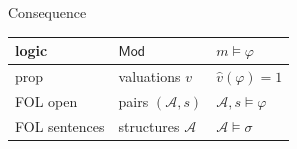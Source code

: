 \begin{modelbox}{Consequence}



\begin{modelbindingblock}
\begin{center}
\begin{tabularx}{\linewidth}{@{}lXX@{}}
\toprule
logic & \(\mathsf{Mod}\) & \(m\models\varphi\) \\
\midrule
prop & valuations \(v\) & \(\widehat v(\varphi)=1\) \\
FOL open & pairs \((\mathcal A,s)\) & \(\mathcal A,s\models\varphi\) \\
FOL sentences & structures \(\mathcal A\) & \(\mathcal A\models\sigma\) \\
\bottomrule
\end{tabularx}
\end{center}
\end{modelbindingblock}
\end{modelbox}
